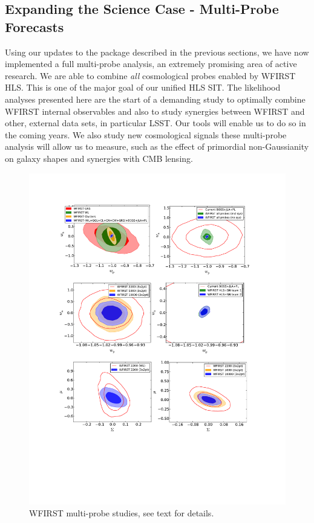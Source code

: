 \subsection{Expanding the Science Case - Multi-Probe Forecasts}
\label{sec:multi-probe}

\begin{summaryii}
Using our updates to the \CoLi package described in the previous sections, we have now implemented a full multi-probe analysis, an extremely promising area of active research. We are able to combine \emph{all} cosmological probes enabled by WFIRST HLS. This is one of the major goal of our unified HLS SIT. The likelihood analyses presented here are the start of a demanding study to optimally combine WFIRST internal observables and also to study synergies between WFIRST and other, external data sets, in particular LSST\@. Our tools will enable us to do so in the coming years. We also study new cosmological signals these multi-probe analysis will allow us to measure, such as the effect of primordial non-Gaussianity on galaxy shapes and synergies with CMB lensing.
\end{summaryii}


\begin{figure}
\includegraphics[width=15cm]{Plots/forecasts/multi}
\caption{WFIRST multi-probe studies, see text for details.}
\label{fi:multi}
\end{figure}

